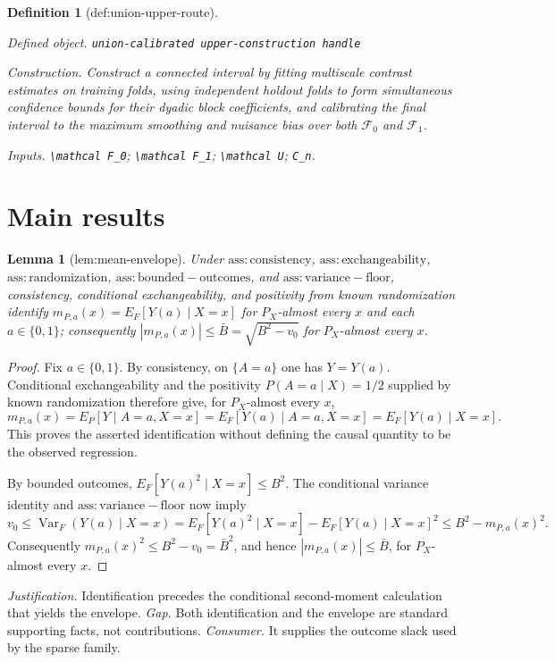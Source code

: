 \documentclass{article}
\newtheorem{definition}{Definition}
\newtheorem{lemma}{Lemma}
\begin{document}
\begin{definition}[def:union-upper-route]\label{def:union-upper-route}
\par\smallskip\noindent\emph{Defined object.} \texttt{union-\allowbreak{}calibrated upper-\allowbreak{}construction handle}
\par\smallskip\noindent\emph{Construction.} Construct a connected interval by fitting multiscale contrast estimates on training folds, using independent holdout folds to form simultaneous confidence bounds for their dyadic block coefficients, and calibrating the final interval to the maximum smoothing and nuisance bias over both \(\mathcal F_0\) and \(\mathcal F_1\).
\par\smallskip\noindent\emph{Inputs.} \texttt{\textbackslash{}\allowbreak{}mathcal F\_\allowbreak{}0}; \texttt{\textbackslash{}\allowbreak{}mathcal F\_\allowbreak{}1}; \texttt{\textbackslash{}\allowbreak{}mathcal U}; \texttt{C\_\allowbreak{}n}.
\end{definition}

\section{Main results}

\begin{lemma}[lem:mean-envelope]\label{lem:mean-envelope}
Under \(\mathrm{ass:consistency}\), \(\mathrm{ass:exchangeability}\), \(\mathrm{ass:randomization}\), \(\mathrm{ass:bounded-outcomes}\), and \(\mathrm{ass:variance-floor}\), consistency, conditional exchangeability, and positivity from known randomization identify \(m_{P,a}(x)=E_F[Y(a)\mid X=x]\) for \(P_X\)-almost every \(x\) and each \(a\in\{0,1\}\); consequently \(|m_{P,a}(x)|\le\bar B=\sqrt{B^2-v_0}\) for \(P_X\)-almost every \(x\).
\end{lemma}
\begin{proof}
Fix \(a\in\{0,1\}\).  By consistency, on \(\{A=a\}\) one has \(Y=Y(a)\).  Conditional exchangeability and the positivity \(P(A=a\mid X)=1/2\) supplied by known randomization therefore give, for \(P_X\)-almost every \(x\),
\[
 m_{P,a}(x)=E_P[Y\mid A=a,X=x]
 =E_F[Y(a)\mid A=a,X=x]
 =E_F[Y(a)\mid X=x].
\]
This proves the asserted identification without defining the causal quantity to be the observed regression.

By bounded outcomes, \(E_F[Y(a)^2\mid X=x]\le B^2\).  The conditional variance identity and \(\mathrm{ass:variance-floor}\) now imply
\[
 v_0\le \operatorname{Var}_F(Y(a)\mid X=x)
 =E_F[Y(a)^2\mid X=x]-E_F[Y(a)\mid X=x]^2
 \le B^2-m_{P,a}(x)^2.
\]
Consequently \(m_{P,a}(x)^2\le B^2-v_0=\bar B^2\), and hence \(|m_{P,a}(x)|\le\bar B\), for \(P_X\)-almost every \(x\).
\end{proof}
\par\smallskip\noindent \textit{Justification.} Identification precedes the conditional second-moment calculation that yields the envelope. \textit{Gap.} Both identification and the envelope are standard supporting facts, not contributions. \textit{Consumer.} It supplies the outcome slack used by the sparse family.
\end{document}
